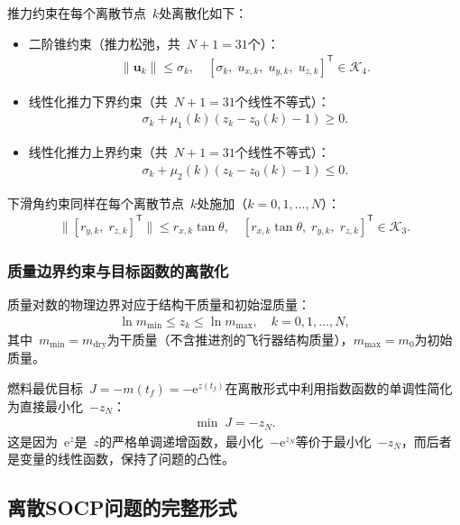 推力约束在每个离散节点~$k$处离散化如下：
\begin{itemize}
  \item 二阶锥约束（推力松弛，共~$N+1=31$个）：
  \begin{align}
  \|\bm u_k\| \le \sigma_k,\quad [\sigma_k,\; u_{x,k},\; u_{y,k},\; u_{z,k}]^{\mathsf T} \in \mathcal K_4.
  \end{align}

  \item 线性化推力下界约束（共~$N+1=31$个线性不等式）：
  \begin{align}
  \sigma_k + \mu_1(k)(z_k - z_0(k) - 1) \ge 0.
  \end{align}

  \item 线性化推力上界约束（共~$N+1=31$个线性不等式）：
  \begin{align}
  \sigma_k + \mu_2(k)(z_k - z_0(k) - 1) \le 0.
  \end{align}
\end{itemize}

下滑角约束同样在每个离散节点~$k$处施加（$k=0,1,\dots,N$）：
\begin{align}
\|[r_{y,k},\; r_{z,k}]^{\mathsf T}\| \le r_{x,k}\tan\theta,
\quad [r_{x,k}\tan\theta,\; r_{y,k},\; r_{z,k}]^{\mathsf T} \in \mathcal K_3.
\end{align}

\subsubsection{质量边界约束与目标函数的离散化}

质量对数的物理边界对应于结构干质量和初始湿质量：
\begin{align}
\ln m_{\min} \le z_k \le \ln m_{\max},\quad k=0,1,\dots,N,
\end{align}
其中~$m_{\min}=m_{\text{dry}}$为干质量（不含推进剂的飞行器结构质量），$m_{\max}=m_0$为初始质量。

燃料最优目标~$J=-m(t_f)=-\mathrm{e}^{z(t_f)}$在离散形式中利用指数函数的单调性简化为直接最小化~$-z_N$：
\begin{align}
\min\; J = -z_N.
\end{align}
这是因为~$\mathrm{e}^{z}$是~$z$的严格单调递增函数，最小化~$-\mathrm{e}^{z_N}$等价于最小化~$-z_N$，而后者是变量的线性函数，保持了问题的凸性。

\subsection{离散SOCP问题的完整形式}\label{sec:socp_form}

